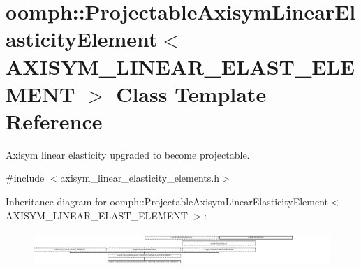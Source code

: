 \hypertarget{classoomph_1_1ProjectableAxisymLinearElasticityElement}{}\section{oomph\+:\+:Projectable\+Axisym\+Linear\+Elasticity\+Element$<$ A\+X\+I\+S\+Y\+M\+\_\+\+L\+I\+N\+E\+A\+R\+\_\+\+E\+L\+A\+S\+T\+\_\+\+E\+L\+E\+M\+E\+NT $>$ Class Template Reference}
\label{classoomph_1_1ProjectableAxisymLinearElasticityElement}


Axisym linear elasticity upgraded to become projectable.  




{\ttfamily \#include $<$axisym\+\_\+linear\+\_\+elasticity\+\_\+elements.\+h$>$}

Inheritance diagram for oomph\+:\+:Projectable\+Axisym\+Linear\+Elasticity\+Element$<$ A\+X\+I\+S\+Y\+M\+\_\+\+L\+I\+N\+E\+A\+R\+\_\+\+E\+L\+A\+S\+T\+\_\+\+E\+L\+E\+M\+E\+NT $>$\+:\begin{figure}[H]
\begin{center}
\leavevmode
\includegraphics[height=1.315789cm]{classoomph_1_1ProjectableAxisymLinearElasticityElement}
\end{center}
\end{figure}
